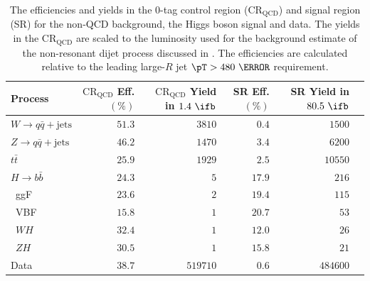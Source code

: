 \begin{table}[htpb]
 \centering
 \caption{The efficiencies and yields in the $0$-tag control region ($\text{CR}_{\text{QCD}}$) and signal region (SR) for the non-QCD background, the Higgs boson signal and data. The yields in the $\text{CR}_{\text{QCD}}$ are scaled to the luminosity used for the background estimate of the non-resonant dijet process discussed in . The efficiencies are calculated relative to the leading large-$R$ jet $\pT > 480~\GeV$ requirement.}
 \begin{adjustbox}{max width=\textwidth}
  \begin{tabular}{@{}lrrrrr@{}}
   \toprule
   Process                             & $\text{CR}_{\text{QCD}}$ Eff. $(\%)$ & $\text{CR}_{\text{QCD}}$ Yield in $1.4~\ifb$ & SR Eff. $(\%)$ & SR Yield in $80.5~\ifb$ \\ \midrule
   $W \to q\bar{q} + \text{jets}$    & $51.3$               & $3810$                       & $0.4$          & $1500$                  \\
   $Z \to q\bar{q} + \text{jets}$    & $46.2$               & $1470$                       & $3.4$          & $6200$                  \\
   $t\bar{t}$                          & $25.9$               & $1929$                       & $2.5$          & $10550$                 \\
   $H \rightarrow b\bar{b}$                              & $24.3$               & $5$                          & $17.9$         & $216$                   \\
   \phantom{$H \rightarrow b\bar{b}$\quad}~ggF           & $23.6$               & $2$                          & $19.4$         & $115$                   \\
   \phantom{$H \rightarrow b\bar{b}$\quad}~VBF           & $15.8$               & $1$                          & $20.7$         & $53$                    \\
   \phantom{$H \rightarrow b\bar{b}$\quad}~$WH$          & $32.4$               & $1$                          & $12.0$         & $26$                    \\
   \phantom{$H \rightarrow b\bar{b}$\quad}~$ZH$          & $30.5$               & $1$                          & $15.8$         & $21$                    \\
   Data                                & $38.7$               & $519710$                     & $0.6$          & $484600$                \\
   \bottomrule
  \end{tabular}
 \end{adjustbox}
 \label{table:efficiencies_and_yields}
\end{table}


